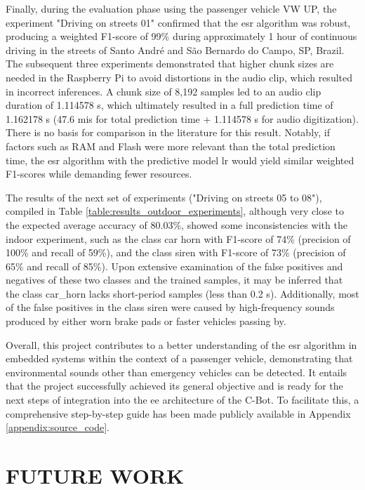
Finally, during the evaluation phase using the passenger vehicle VW UP, the experiment "Driving on streets 01" confirmed that the \gls{esr} algorithm was robust, producing a weighted F1-score of 99\% during approximately 1 hour of continuous driving in the streets of Santo André and São Bernardo do Campo, SP, Brazil. The subsequent three experiments demonstrated that higher chunk sizes are needed in the Raspberry Pi to avoid distortions in the audio clip, which resulted in incorrect inferences. A chunk size of 8,192 samples led to an audio clip duration of 1.114578 \gls{s}, which ultimately resulted in a full prediction time of 1.162178 \gls{s} (47.6 \gls{mi}\gls{s} for total prediction time + 1.114578 \gls{s} for audio digitization). There is no basis for comparison in the literature for this result. Notably, if factors such as RAM and Flash were more relevant than the total prediction time, the \gls{esr} algorithm with the predictive model \gls{lr} would yield similar weighted F1-scores while demanding fewer resources.

The results of the next set of experiments ("Driving on streets 05 to 08"), compiled in Table \ref{table:results_outdoor_experiments}, although very close to the expected average accuracy of 80.03\%, showed some inconsistencies with the indoor experiment, such as the class car horn with F1-score of 74\% (precision of 100\% and recall of 59\%), and the class siren with F1-score of 73\% (precision of 65\% and recall of 85\%). Upon extensive examination of the false positives and negatives of these two classes and the trained samples, it may be inferred that the class car\_horn lacks short-period samples (less than 0.2 \gls{s}). Additionally, most of the false positives in the class siren were caused by high-frequency sounds produced by either worn brake pads or faster vehicles passing by.

Overall, this project contributes to a better understanding of the \gls{esr} algorithm in embedded systems within the context of a passenger vehicle, demonstrating that environmental sounds other than emergency vehicles can be detected. It entails that the project successfully achieved its general objective and is ready for the next steps of integration into the \gls{ee} architecture of the C-Bot. To facilitate this, a comprehensive step-by-step guide has been made publicly available in Appendix \ref{appendix:source_code}.


\section{FUTURE WORK}
\label{sec:results_future_work}

